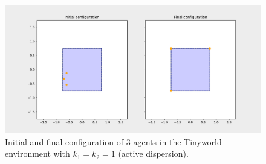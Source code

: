 \begin{figure}[H]
  \centering
  \includegraphics[width=\textwidth]{figs/tinyworld_3_agnt_k_1_1_k_2_1_distr.pdf}
  \caption{Initial and final configuration of 3 agents in the Tinyworld environment with $k_{1} = k_{2} = 1$ (active dispersion).}
  \label{fig:3_agnt_tw_k_1_1_k_2_1_distr}
\end{figure}

